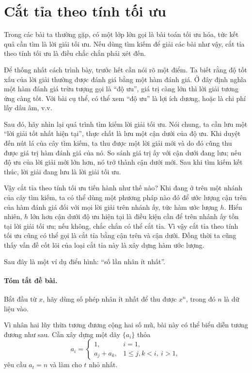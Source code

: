 \documentclass[11pt]{article}
\begin{document}
\section{Cắt tỉa theo tính tối ưu}

Trong các bài ta thường gặp, có một lớp lớn gọi là bài toán tối ưu hóa, tức
kết quả cần tìm là lời giải tối ưu. Nếu dùng tìm kiếm để giải các bài như vậy,
cắt tỉa theo tính tối ưu là điều chắc chắn phải xét đến.

Để thống nhất cách trình bày, trước hết cần nói rõ một điểm. Ta biết rằng độ
tốt xấu của lời giải thường được đánh giá bằng một hàm đánh giá. Ở đây định
nghĩa một hàm đánh giá trừu tượng gọi là ``độ ưu'', giá trị càng lớn thì lời
giải tương ứng càng tốt. Với bài cụ thể, có thể xem ``độ ưu'' là lợi ích
dương, hoặc là chi phí lấy dấu âm, v.v.

Sau đó, hãy nhìn lại quá trình tìm kiếm lời giải tối ưu. Nói chung, ta cần
lưu một ``lời giải tốt nhất hiện tại'', thực chất là lưu một cận dưới của độ
ưu. Khi duyệt đến nút lá của cây tìm kiếm, ta thu được một lời giải mới và do
đó cũng thu được giá trị hàm đánh giá của nó. So sánh giá trị ấy với cận dưới
đang lưu; nếu độ ưu của lời giải mới lớn hơn, nó trở thành cận dưới mới. Sau
khi tìm kiếm kết thúc, lời giải đang lưu là lời giải tối ưu.

Vậy cắt tỉa theo tính tối ưu tiến hành như thế nào? Khi đang ở trên một nhánh
của cây tìm kiếm, ta có thể dùng một phương pháp nào đó để ước lượng cận trên
của hàm đánh giá đối với mọi lời giải trên nhánh ấy, tức hàm ước lượng \(h\).
Hiển nhiên, \(h\) lớn hơn cận dưới độ ưu hiện tại là điều kiện cần để trên
nhánh ấy tồn tại lời giải tối ưu; nếu không, chắc chắn có thể cắt tỉa. Vì vậy
cắt tỉa theo tính tối ưu cũng có thể gọi là cắt tỉa bằng cận trên và cận
dưới. Đồng thời ta cũng thấy vấn đề cốt lõi của loại cắt tỉa này là xây dựng
hàm ước lượng.

Sau đây là một ví dụ điển hình: ``số lần nhân ít nhất''.

\paragraph{Tóm tắt đề bài.}
Bắt đầu từ \(x\), hãy dùng số phép nhân ít nhất để thu được \(x^n\), trong đó
\(n\) là dữ liệu vào.

Vì nhân hai lũy thừa tương đương cộng hai số mũ, bài này có thể biểu diễn
tương đương như sau. Cần xây dựng một dãy \(\{a_i\}\) thỏa
\[
  a_i =
  \begin{cases}
    1, & i=1,\\
    a_j+a_k, & 1\le j,k<i,\ i>1,
  \end{cases}
\]
yêu cầu \(a_t=n\) và làm cho \(t\) nhỏ nhất.
\end{document}
